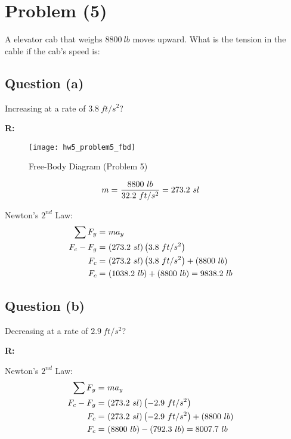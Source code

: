 \section{Problem (5)}
	A elevator cab that weighs $8800 \ lb$ moves upward. What is the tension in the cable if the cab's speed is:

	\subsection{Question (a)}
		Increasing at a rate of $3.8 \ ft/s^{2}$?

		\textbf{R:} \newline

		\begin{figure}[H]
			\begin{center}
				\texttt{[image: hw5\_problem5\_fbd]}
				\caption{Free-Body Diagram (Problem 5)}
				\label{fig:hw5_problem5_fbd}
			\end{center}
		\end{figure}

		\begin{align}
			m = \ &\frac{8800 \ lb}{32.2 \ ft/s^{2}} = 273.2 \ sl& \notag
		\end{align}

		Newton's $2^{nd}$ Law:
		\begin{align}
			\sum F_{y} = \ &ma_{y}& \notag \\
			F_{c} - F_{g} = \ &(273.2 \ sl)\left( 3.8 \ ft/s^{2}\right)& \notag \\
			F_{c} = \ &(273.2 \ sl)\left( 3.8 \ ft/s^{2}\right) + (8800 \ lb)& \notag \\
			F_{c} = \ &(1038.2 \ lb) + (8800 \ lb) = 9838.2 \ lb&
		\end{align}

	\subsection{Question (b)}
		Decreasing at a rate of $2.9 \ ft/s^{2}$?

		\textbf{R:} \newline
		
		Newton's $2^{nd}$ Law:
		\begin{align}
			\sum F_{y} = \ &ma_{y}& \notag \\
			F_{c} - F_{g} = \ &(273.2 \ sl)\left( - 2.9 \ ft/s^{2}\right)& \notag \\
			F_{c} = \ &(273.2 \ sl)\left( - 2.9 \ ft/s^{2}\right) + (8800 \ lb)& \notag \\
			F_{c} = \ &(8800 \ lb) - (792.3 \ lb) = 8007.7 \ lb&
		\end{align}
